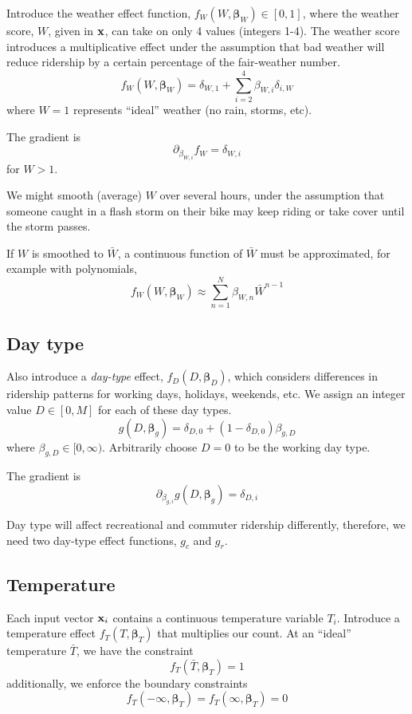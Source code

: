 \documentclass{article}
\newcommand{\bx}{{\bf x}}
\newcommand{\bbeta}{\boldsymbol\beta}
\begin{document}
Introduce the weather effect function, $f_W(W, \bbeta_W) \in [0, 1]$, where the
weather score, $W$, given in $\bx$, can take on only 4 values
(integers 1-4).  The weather score introduces a multiplicative effect under
the assumption that bad weather will reduce ridership by a certain
percentage of the fair-weather number.
\[
f_W(W, \bbeta_W) = \delta_{W,1} + \sum_{i=2}^4 \beta_{W,i} \delta_{i,W}
\]
where $W=1$ represents ``ideal''
weather (no rain, storms, etc).

The gradient is
\[
\partial_{\beta_{W,i}} f_W = \delta_{W,i}
\]
for $W > 1$.


We might smooth (average) $W$ 
over several hours, under the assumption that someone caught in a
flash storm on their bike may keep riding or take cover until the
storm passes.

If $W$ is smoothed to $\bar{W}$, a continuous function of $\bar{W}$
must be approximated, for example with polynomials,
\[
f_W(W, \bbeta_W) \approx \sum_{n=1}^N \beta_{W,n} \bar{W}^{n-1}
\]


\subsection*{Day type}

Also introduce a {\it day-type} effect, $f_D(D, \bbeta_D)$, which
considers differences in ridership patterns for working days,
holidays, weekends, etc. We assign an integer value $D \in [0, M]$ for each of these
day types.
\[
g(D, \bbeta_g) = \delta_{D,0} + (1 - \delta_{D,0}) \beta_{g,D}
\]
where $\beta_{g,D} \in [0, \infty)$. Arbitrarily choose $D = 0$ to be the
working day type.

The gradient is
\[
\partial_{\beta_{g,i}} g(D, \bbeta_g) = \delta_{D,i}
\]

Day type will affect recreational and commuter ridership differently,
therefore, we need two day-type effect functions, $g_c$ and $g_r$.

\subsection*{Temperature}

Each input vector $\bx_i$ contains a continuous temperature variable
$T_i$.
Introduce a temperature effect $f_T(T, \bbeta_T)$
that multiplies our count. At an
``ideal'' temperature $\bar{T}$, we have the constraint
\[
f_T(\bar{T}, \bbeta_T) = 1
\]
additionally, we enforce the boundary constraints
\[
f_T(-\infty, \bbeta_T) = f_T(\infty, \bbeta_T) = 0
\]
\end{document}
